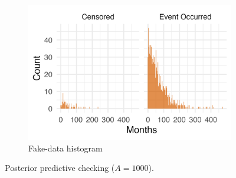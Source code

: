 \begin{figure}[htbp]
\begin{subfigure}[t]{0.37\textwidth}
  \centering
  \includegraphics[width=\linewidth]{images/fake_duration_hist_a1000.png}   %
  \caption{Fake-data histogram}
  \label{fig:fake-hist_a1000}
\end{subfigure}
\caption{Posterior predictive checking ($A=1000$).}
\label{fig:ppc-A1000}
\end{figure}

